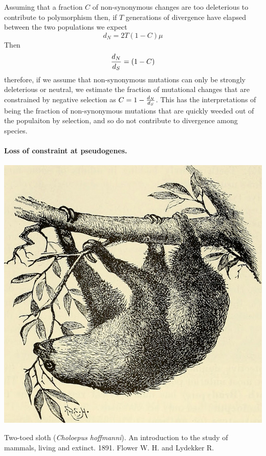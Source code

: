 Assuming that a fraction $C$ of non-synonymous changes are too
deleterious to contribute to polymorphism then, if $T$ generations of divergence have
elapsed between the two populations we expect
\begin{equation}
d_N = 2T (1-C) \mu  
\end{equation}
Then
\begin{equation} 
\frac{d_N}{d_S} = (1-C) 
\end{equation}
therefore, if we assume that non-synonymous mutations can only be
strongly deleterious or neutral, we estimate the fraction of mutational changes that
are constrained by negative selection as $C= 1- \frac{d_N}{d_S}$. This has the
interpretations of being the fraction of non-synonymous mutations that
are quickly weeded out of the populaiton by selection, and so do not
contribute to divergence among species. 

\paragraph{Loss of constraint at pseudogenes.}

\begin{marginfigure}
\begin{center}
\includegraphics[width=\textwidth]{illustration_images/Genetic_drift/sloth/20423856040_6e4360df9c_z.jpg}
\end{center}
\caption{Two-toed sloth ({\it Choloepus hoffmanni}). An introduction
  to the study of mammals, living and extinct. 1891. Flower W. H. and Lydekker R.} \label{fig:sloth}  
\end{marginfigure} 

